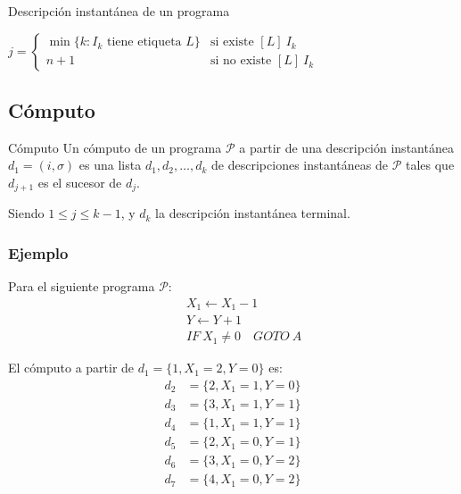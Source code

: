 \begin{definicion}{Descripción instantánea de un programa}{}
\begin{itemize}
\begin{enumerate}
\begin{itemize}
                        $j = \begin{cases} 
                    \min{\{ k: I_k \text{ tiene etiqueta } L \}} & \text{si 
                    existe } [L] ~ I_k \\
                    n+1 & \text{si no existe } [L] ~ I_k
                \end{cases}$
                \end{itemize}
        \end{enumerate}
    \end{itemize}
\end{definicion}

\subsection{Cómputo}
\begin{definicion}{Cómputo}{}
    Un cómputo de un programa $\mathcal{P}$ a partir de una descripción 
    instantánea $d_1 = (i, \sigma)$ es una lista 
    $d_1, d_2, \dotsc, d_k$ de descripciones
    instantáneas de $\mathcal{P}$ tales que $d_{j+1}$ es el sucesor de $d_j$.

    Siendo $ 1 \leq j \leq k-1$, y $d_k$ la descripción 
    instantánea terminal.
\end{definicion}

\subsubsection{Ejemplo}

Para el siguiente programa $\mathcal{P}$:
\begin{align*}
    [A] \quad &X_1 \gets X_1 - 1 \\
                &Y \gets Y + 1 \\
                &IF ~ X_1 \neq 0 \quad GOTO ~ A
\end{align*}

El cómputo a partir de $d_1 = \{ 1, X_1 = 2, Y = 0 \}$ es:
\begin{align*}
    d_2 &= \{ 2, X_1 = 1, Y = 0 \} \\
    d_3 &= \{ 3, X_1 = 1, Y = 1 \} \\
    d_4 &= \{ 1, X_1 = 1, Y = 1 \} \\
    d_5 &= \{ 2, X_1 = 0, Y = 1 \} \\
    d_6 &= \{ 3, X_1 = 0, Y = 2 \} \\
    d_7 &= \{ 4, X_1 = 0, Y = 2 \}
\end{align*}

